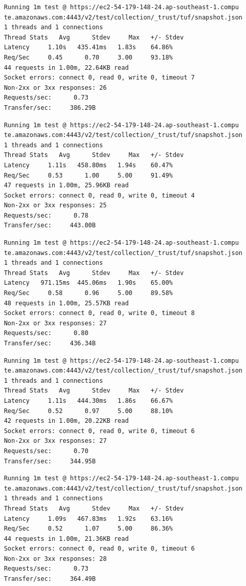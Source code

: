 \documentclass[a4paper,12pt]{article}
\newcounter{subsubsubsection}[subsubsection]
\begin{document}
{{	
	\begin{verbatim}
	Running 1m test @ https://ec2-54-179-148-24.ap-southeast-1.compu
	te.amazonaws.com:4443/v2/test/collection/_trust/tuf/snapshot.json
	1 threads and 1 connections
	Thread Stats   Avg      Stdev     Max   +/- Stdev
	Latency     1.10s   435.41ms   1.83s    64.86%
	Req/Sec     0.45      0.70     3.00     93.18%
	44 requests in 1.00m, 22.64KB read
	Socket errors: connect 0, read 0, write 0, timeout 7
	Non-2xx or 3xx responses: 26
	Requests/sec:      0.73
	Transfer/sec:     386.29B
	\end{verbatim}
	\begin{verbatim}
	Running 1m test @ https://ec2-54-179-148-24.ap-southeast-1.compu
	te.amazonaws.com:4443/v2/test/collection/_trust/tuf/snapshot.json
	1 threads and 1 connections
	Thread Stats   Avg      Stdev     Max   +/- Stdev
	Latency     1.11s   458.80ms   1.94s    60.47%
	Req/Sec     0.53      1.00     5.00     91.49%
	47 requests in 1.00m, 25.96KB read
	Socket errors: connect 0, read 0, write 0, timeout 4
	Non-2xx or 3xx responses: 25
	Requests/sec:      0.78
	Transfer/sec:     443.00B
	\end{verbatim}
	\begin{verbatim}
	Running 1m test @ https://ec2-54-179-148-24.ap-southeast-1.compu
	te.amazonaws.com:4443/v2/test/collection/_trust/tuf/snapshot.json
	1 threads and 1 connections
	Thread Stats   Avg      Stdev     Max   +/- Stdev
	Latency   971.15ms  445.06ms   1.90s    65.00%
	Req/Sec     0.58      0.96     5.00     89.58%
	48 requests in 1.00m, 25.57KB read
	Socket errors: connect 0, read 0, write 0, timeout 8
	Non-2xx or 3xx responses: 27
	Requests/sec:      0.80
	Transfer/sec:     436.34B
	\end{verbatim}
	\newpage
	\begin{verbatim}
	Running 1m test @ https://ec2-54-179-148-24.ap-southeast-1.compu
	te.amazonaws.com:4443/v2/test/collection/_trust/tuf/snapshot.json
	1 threads and 1 connections
	Thread Stats   Avg      Stdev     Max   +/- Stdev
	Latency     1.11s   444.30ms   1.86s    66.67%
	Req/Sec     0.52      0.97     5.00     88.10%
	42 requests in 1.00m, 20.22KB read
	Socket errors: connect 0, read 0, write 0, timeout 6
	Non-2xx or 3xx responses: 27
	Requests/sec:      0.70
	Transfer/sec:     344.95B
	\end{verbatim}
	\begin{verbatim}
	Running 1m test @ https://ec2-54-179-148-24.ap-southeast-1.compu
	te.amazonaws.com:4443/v2/test/collection/_trust/tuf/snapshot.json
	1 threads and 1 connections
	Thread Stats   Avg      Stdev     Max   +/- Stdev
	Latency     1.09s   467.83ms   1.92s    63.16%
	Req/Sec     0.52      1.07     5.00     86.36%
	44 requests in 1.00m, 21.36KB read
	Socket errors: connect 0, read 0, write 0, timeout 6
	Non-2xx or 3xx responses: 28
	Requests/sec:      0.73
	Transfer/sec:     364.49B
	\end{verbatim}
	\newpage
	
}}
\end{document}

